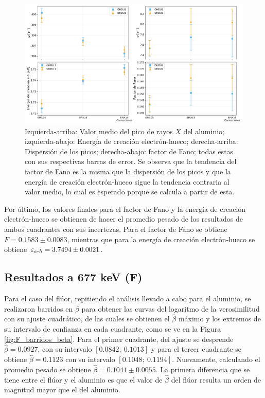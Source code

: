 \begin{figure}[h]
    \centering
        \includegraphics[scale=0.45]{Figs/Al_mu_sigma_fano_Eeh.pdf}
    \caption{Izquierda-arriba: Valor medio del pico de rayos $X$ del aluminio; izquierda-abajo: Energía de creación electrón-hueco; derecha-arriba: Dispersión de los picos; derecha-abajo: factor de Fano; todas estas con sus respectivas barras de error. Se observa que la tendencia del factor de Fano es la misma que la dispersión de los picos y que la energía de creación electrón-hueco sigue la tendencia contraria al valor medio, lo cual es esperado porque se calcula a partir de esta.}
    \label{fig:Al_mu_sigma_fano_eh}
\end{figure}

Por último, los valores finales para el factor de Fano y la energía de creación electrón-hueco se obtienen de hacer el promedio pesado de los resultados de ambos cuadrantes con sus incertezas. Para el factor de Fano se obtiene $ F = 0.1583 \pm 0.0083 $, mientras que para la energía de creación electrón-hueco se obtiene $\varepsilon_{e\mbox{-}h} = 3.7494 \pm 0.0021 $.
\subsection{Resultados a 677 keV (F)}
\noindent Para el caso del flúor, repitiendo el análisis llevado a cabo para el aluminio, se realizaron barridos en $\beta$ para obtener las curvas del logaritmo de la verosimilitud con su ajuste cuadrático, de las cuales se obtienen el $\hat{\beta}$ máximo y los extremos de su intervalo de confianza en cada cuadrante, como se ve en la Figura \ref{fig:F_barridos_beta}. Para el primer cuadrante, del ajuste se desprende $\hat{\beta} = 0.0927 $, con su intervalo $[0.0842;\ 0.1013]$ y para el tercer cuadrante se obtiene $\hat{\beta} = 0.1123 $ con su intervalo $[0.1048;\ 0.1194]$. Nuevamente, calculando el promedio pesado se obtiene $\hat{\beta} = 0.1041 \pm 0.0055 $. La primera diferencia que se tiene entre el flúor y el aluminio es que el valor de $\hat{\beta}$ del flúor resulta un orden de magnitud mayor que el del aluminio.

